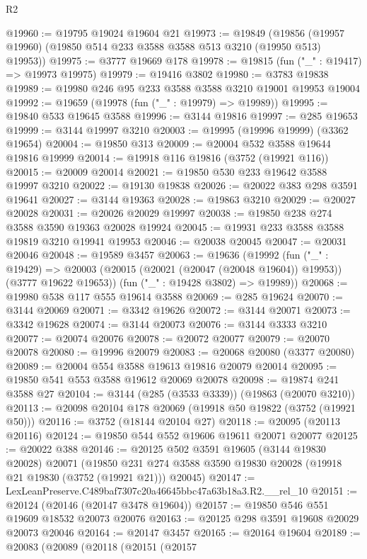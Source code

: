 \begin{lexlean}{R2}
\begin{coremodule}
@19960 := @19795 @19024 @19604 @21
@19973 := @19849
    (@19856 (@19957 @19960) (@19850 @514 @233 @3588 @3588 @513 @3210 (@19950 @513) @19953))
@19975 := @3777 @19669 @178
@19978 := @19815 (fun ("_" : @19417) => @19973 @19975)
@19979 := @19416 @3802
@19980 := @3783 @19838
@19989 := @19980 @246 @95 @233 @3588 @3588 @3210 @19001 @19953 @19004
@19992 := @19659 (@19978 (fun ("_" : @19979) => @19989))
@19995 := @19840 @533 @19645 @3588
@19996 := @3144 @19816
@19997 := @285 @19653
@19999 := @3144 @19997 @3210
@20003 := @19995 (@19996 @19999) (@3362 @19654)
@20004 := @19850 @313
@20009 := @20004 @532 @3588 @19644 @19816 @19999
@20014 := @19918 @116 @19816 (@3752 (@19921 @116))
@20015 := @20009 @20014
@20021 := @19850 @530 @233 @19642 @3588 @19997 @3210
@20022 := @19130 @19838
@20026 := @20022 @383 @298 @3591 @19641
@20027 := @3144 @19363
@20028 := @19863 @3210
@20029 := @20027 @20028
@20031 := @20026 @20029 @19997
@20038 := @19850 @238 @274 @3588 @3590 @19363 @20028 @19924
@20045 := @19931 @233 @3588 @3588 @19819 @3210 @19941 @19953
@20046 := @20038 @20045
@20047 := @20031 @20046
@20048 := @19589 @3457
@20063 := @19636
    (@19992
      (fun ("_" : @19429) =>
      @20003 (@20015 (@20021 (@20047 (@20048 @19604)) @19953)) (@3777 @19622 @19653))
      (fun ("_" : @19428 @3802) => @19989))
@20068 := @19980 @538 @117 @555 @19614 @3588
@20069 := @285 @19624
@20070 := @3144 @20069
@20071 := @3342 @19626
@20072 := @3144 @20071
@20073 := @3342 @19628
@20074 := @3144 @20073
@20076 := @3144 @3333 @3210
@20077 := @20074 @20076
@20078 := @20072 @20077
@20079 := @20070 @20078
@20080 := @19996 @20079
@20083 := @20068 @20080 (@3377 @20080)
@20089 := @20004 @554 @3588 @19613 @19816 @20079 @20014
@20095 := @19850 @541 @553 @3588 @19612 @20069 @20078
@20098 := @19874 @241 @3588 @27
@20104 := @3144 (@285 (@3533 @3339)) (@19863 (@20070 @3210))
@20113 := @20098 @20104 @178 @20069 (@19918 @50 @19822 (@3752 (@19921 @50)))
@20116 := @3752 (@18144 @20104 @27)
@20118 := @20095 (@20113 @20116)
@20124 := @19850 @544 @552 @19606 @19611 @20071 @20077
@20125 := @20022 @388
@20146 := @20125
    @502
    @3591
    @19605
    (@3144 @19830 @20028)
    @20071
    (@19850 @231 @274 @3588 @3590 @19830 @20028 (@19918 @21 @19830 (@3752 (@19921 @21))) @20045)
@20147 := LexLeanPreserve.C489baf7307c20a46645bbc47a63b18a3.R2.__rel_10
@20151 := @20124 (@20146 (@20147 @3478 @19604))
@20157 := @19850 @546 @551 @19609 @18532 @20073 @20076
@20163 := @20125 @298 @3591 @19608 @20029 @20073 @20046
@20164 := @20147 @3457
@20165 := @20164 @19604
@20189 := @20083
    (@20089
      (@20118
        (@20151
          (@20157

\end{coremodule}
\end{lexlean}
